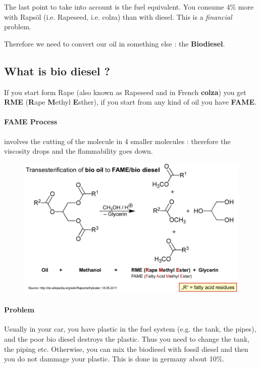\documentclass[10pt,a4paper]{article}
\begin{document}
The last point to take into account is the fuel equivalent. You consume 4\% more with Rapsöl (i.e. Rapeseed, i.e. colza) than with diesel. This is a \emph{financial} problem.

Therefore we need to convert our oil in something else : the \textbf{Biodiesel}.

\subsection{What is bio diesel ?}
If you start form Rape (also known as Rapeseed and in French \textbf{colza}) you get \textbf{RME} (\textbf{R}ape \textbf{M}ethyl \textbf{E}sther), if you start from any kind of oil you have \textbf{FAME}.

\paragraph{FAME Process}involves the cutting of the molecule in 4 smaller molecules : therefore the viscosity drops and the flammability goes down.

\begin{figure}
\includegraphics[scale=0.5]{Image/FAME.png}
\end{figure}

\paragraph{Problem}Usually in your car, you have plastic in the fuel system (e.g. the tank, the pipes), and the poor bio diesel destroys the plastic. Thus you need to change the tank, the piping etc. Otherwise, you can mix the biodiesel with fossil diesel and then you do not dammage your plastic. This is done in germany about 10\%.
\end{document}
